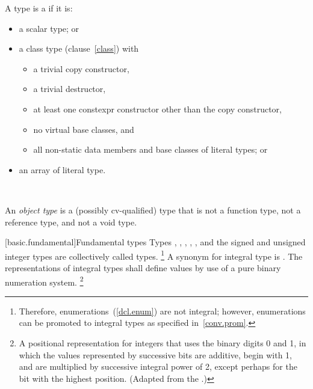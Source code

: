 \documentclass[american]{book}
\begin{document}
\begin{paras}
\pnum
{}

\pnum
A type is a  if it is:

\begin{itemize}
\item{a scalar type; or}
\item{a class type (clause~\ref{class}) with}
\begin{itemize}
\item{a trivial copy constructor,}
\item{a trivial destructor,}
\item{at least one constexpr constructor other than
the copy constructor,}
\item{no virtual base classes, and}
\item{all non-static data members and base classes
of literal types; or}
\end{itemize}
\item{an array of literal type.}
\end{itemize}

\pnum
{}

\exitnote\ 

\setcounter{Paras}{7}
\pnum
An \emph{object type} is a (possibly cv-qualified) type that is not a
function type, not a reference type, and not a void type. 

[basic.fundamental]{Fundamental types}
\setcounter{Paras}{6}
\pnum
Types , , , ,
, and the signed and unsigned integer types are
collectively called
%
 types.%
\footnote{
Therefore, enumerations~(\ref{dcl.enum}) are not integral; however,
enumerations can be promoted to integral types as specified
in~\ref{conv.prom}.%
}
A synonym for integral type is
%
. The representations of integral types shall
define values by use of  a pure binary numeration system.%
\footnote{
A positional representation for integers that uses the binary digits 0
and 1, in which the values represented by successive bits are additive,
begin with 1, and are multiplied by successive integral power of 2,
except perhaps for the bit with the highest position. (Adapted from the
  
  
.)%
}

\pnum
{}


\end{paras}
\end{document}
